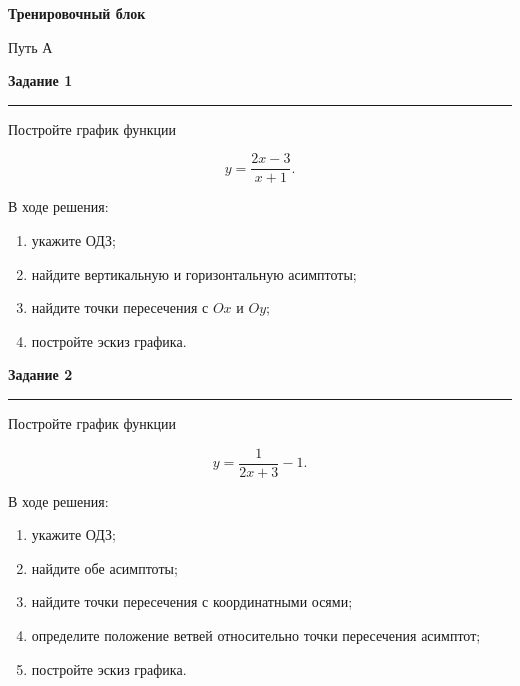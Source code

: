 \documentclass[a4paper,12pt]{article}
\newcommand{\sectiontitle}[1]{%
    \par\vspace{0.65em}
    {\Large\bfseries\color{darkaccent}#1}\par
    \vspace{0.15em}
    {\color{accent}\rule{\linewidth}{0.65pt}}\par
    \vspace{0.3em}
}
\begin{document}
\clearpage

\begin{center}
{\LARGE\bfseries\color{darkaccent}
Тренировочный блок}

\vspace{0.2cm}

{\large Путь А}

\vspace{0.15cm}


\end{center}

\vspace{0.4cm}

\sectiontitle{Задание 1}

Постройте график функции

\[
\boxed{y=\frac{2x-3}{x+1}}.
\]

В ходе решения:

\begin{enumerate}[label=\alph*)]
    \item укажите ОДЗ;
    \item найдите вертикальную и горизонтальную асимптоты;
    \item найдите точки пересечения с \(Ox\) и \(Oy\);
    \item постройте эскиз графика.
\end{enumerate}

\vspace{0.6cm}

\sectiontitle{Задание 2}

Постройте график функции

\[
\boxed{y=\frac1{2x+3}-1}.
\]

В ходе решения:

\begin{enumerate}[label=\alph*)]
    \item укажите ОДЗ;
    \item найдите обе асимптоты;
    \item найдите точки пересечения с координатными осями;
    \item определите положение ветвей относительно точки пересечения асимптот;
    \item постройте эскиз графика.
\end{enumerate}

\vspace{0.6cm}
\end{document}
